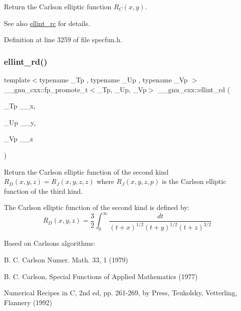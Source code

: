 Return the Carlson elliptic function $ R_C(x,y) $.

\begin{DoxySeeAlso}{See also}
\hyperlink{group__gnu__math__spec__func_ga7d3d42f5f71a74266be8aaca528056bf}{ellint\+\_\+rc} for details. 
\end{DoxySeeAlso}


Definition at line 3259 of file specfun.\+h.

\mbox{\label{group__gnu__math__spec__func_gad29dae6abc783c8fe952dba477e65309}} 
\subsubsection{\texorpdfstring{ellint\+\_\+rd()}{ellint\_rd()}}
{\footnotesize\ttfamily template$<$typename \+\_\+\+Tp , typename \+\_\+\+Up , typename \+\_\+\+Vp $>$ \\
\+\_\+\+\_\+gnu\+\_\+cxx\+::fp\+\_\+promote\+\_\+t$<$\+\_\+\+Tp, \+\_\+\+Up, \+\_\+\+Vp$>$ \+\_\+\+\_\+gnu\+\_\+cxx\+::ellint\+\_\+rd (\begin{DoxyParamCaption}\item[{\+\_\+\+Tp}]{\+\_\+\+\_\+x,  }\item[{\+\_\+\+Up}]{\+\_\+\+\_\+y,  }\item[{\+\_\+\+Vp}]{\+\_\+\+\_\+z }\end{DoxyParamCaption})\hspace{0.3cm}{\ttfamily [inline]}}

Return the Carlson elliptic function of the second kind $ R_D(x,y,z) = R_J(x,y,z,z) $ where $ R_J(x,y,z,p) $ is the Carlson elliptic function of the third kind.

The Carlson elliptic function of the second kind is defined by\+: \[ R_D(x,y,z) = \frac{3}{2} \int_0^\infty \frac{dt}{(t + x)^{1/2}(t + y)^{1/2}(t + z)^{3/2}} \]

Based on Carlson\textquotesingle{}s algorithms\+:
\begin{DoxyItemize}
\item B. C. Carlson Numer. Math. 33, 1 (1979)
\item B. C. Carlson, Special Functions of Applied Mathematics (1977)
\item Numerical Recipes in C, 2nd ed, pp. 261-\/269, by Press, Teukolsky, Vetterling, Flannery (1992)
\end{DoxyItemize}


